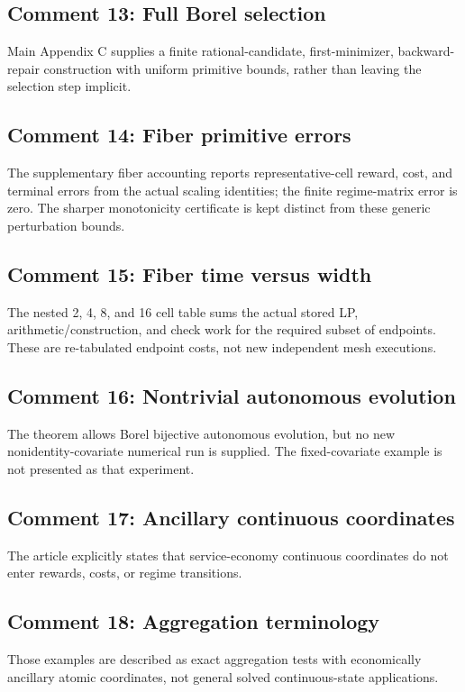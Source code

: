 \subsection{Comment 13: Full Borel selection}
Main Appendix C supplies a finite rational-candidate, first-minimizer, backward-repair construction with uniform primitive bounds, rather than leaving the selection step implicit.

\subsection{Comment 14: Fiber primitive errors}
The supplementary fiber accounting reports representative-cell reward, cost, and terminal errors from the actual scaling identities; the finite regime-matrix error is zero. The sharper monotonicity certificate is kept distinct from these generic perturbation bounds.

\subsection{Comment 15: Fiber time versus width}
The nested 2, 4, 8, and 16 cell table sums the actual stored LP, arithmetic/construction, and check work for the required subset of endpoints. These are re-tabulated endpoint costs, not new independent mesh executions.

\subsection{Comment 16: Nontrivial autonomous evolution}
The theorem allows Borel bijective autonomous evolution, but no new nonidentity-covariate numerical run is supplied. The fixed-covariate example is not presented as that experiment.

\subsection{Comment 17: Ancillary continuous coordinates}
The article explicitly states that service-economy continuous coordinates do not enter rewards, costs, or regime transitions.

\subsection{Comment 18: Aggregation terminology}
Those examples are described as exact aggregation tests with economically ancillary atomic coordinates, not general solved continuous-state applications.

